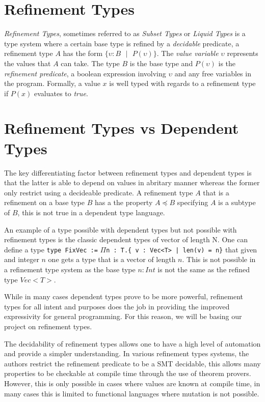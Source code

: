 \documentclass[a4paper,12pt]{report}
\begin{document}
\section{Refinement Types}
\textit{Refinement Types}, sometimes referred to as \textit{Subset Types} 
\cite{subsetTypes} or \textit{Liquid Types} \cite{liquidTypes} 
is a type system where a certain base type is refined by a 
\textit{decidable} predicate, a refinement type $A$ has the form 
$\{\upsilon : B\text{ }|\text{ }P(\upsilon)\}$. The \textit{value variable} 
$\upsilon$ represents the values that $A$ can take. The type $B$ is the 
base type and $P(\upsilon)$ is the \textit{refinement predicate}, 
a boolean expression involving $\upsilon$ and any free variables in the program. 
Formally, a value $x$ is well typed with regards to a refinement type 
if $P(x)$ evaluates to \textit{true}.

\section{Refinement Types vs Dependent Types}
The key differentiating factor between refinement types and dependent types is 
that the latter is able to depend on values in abritary manner whereas 
the former only restrict using a decideable predicate. A refinement type $A$ 
that is a refinement on a base type $B$ has a the property $A \preceq B$ 
specifying $A$ is a subtype of $B$, this is not true in a dependent type 
language.

\par
An example of a type possible with dependent types but not possible with 
refinement types is the classic dependent types of vector of length N. One can 
define a type \verb|type FixVec :=| $\Pi$\verb+n : T.{ v : Vec<T> | len(v) = n}+ 
that given and integer $n$ one gets a type that is a vector of length $n$. This 
is not possible in a refinement type system as the base type $n : Int$ is not 
the same as the refined type $Vec<T>$.

\par
While in many cases dependent types prove to be 
more powerful, refinement types for all intent and purposes does the job in 
providing the improved expressivity for general programming. For this reason, we 
will be basing our project on refinement types. 

\par
The decidability of refinement types allows one to have a high level of automation and 
provide a simpler understanding. In various refinement types systems, the authors  
restrict the refinement predicate to be a SMT decidable, this allows many 
properties to be checkable at compile time through the use of theorem provers. 
However, this is only possible in cases where values are known at compile time, 
in many cases this is limited to functional languages where mutation is not possible. 
\end{document}
